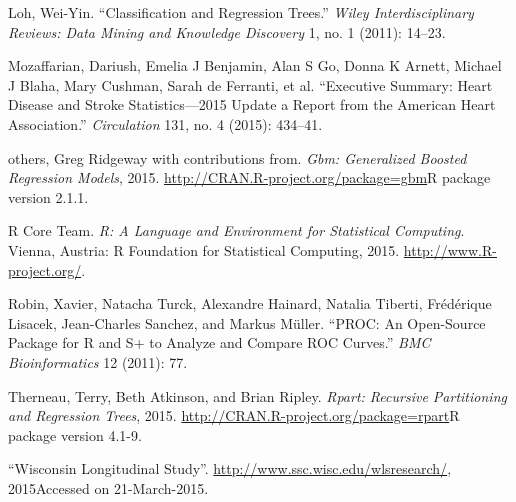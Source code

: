 \documentclass[11pt,]{article}
\begin{document}
Loh, Wei-Yin. ``Classification and Regression Trees.'' \emph{Wiley
Interdisciplinary Reviews: Data Mining and Knowledge Discovery} 1, no. 1
(2011): 14--23.

Mozaffarian, Dariush, Emelia J Benjamin, Alan S Go, Donna K Arnett,
Michael J Blaha, Mary Cushman, Sarah de Ferranti, et al. ``Executive
Summary: Heart Disease and Stroke Statistics---2015 Update a Report from
the American Heart Association.'' \emph{Circulation} 131, no. 4 (2015):
434--41.

others, Greg Ridgeway with contributions from. \emph{Gbm: Generalized
Boosted Regression Models}, 2015.
\url{http://CRAN.R-project.org/package=gbm}R package version 2.1.1.

R Core Team. \emph{R: A Language and Environment for Statistical
Computing}. Vienna, Austria: R Foundation for Statistical Computing,
2015. \url{http://www.R-project.org/}.

Robin, Xavier, Natacha Turck, Alexandre Hainard, Natalia Tiberti,
Frédérique Lisacek, Jean-Charles Sanchez, and Markus Müller. ``PROC: An
Open-Source Package for R and S+ to Analyze and Compare ROC Curves.''
\emph{BMC Bioinformatics} 12 (2011): 77.

Therneau, Terry, Beth Atkinson, and Brian Ripley. \emph{Rpart: Recursive
Partitioning and Regression Trees}, 2015.
\url{http://CRAN.R-project.org/package=rpart}R package version 4.1-9.

``Wisconsin Longitudinal Study''.
\url{http://www.ssc.wisc.edu/wlsresearch/}, 2015Accessed on
21-March-2015.
\end{document}
